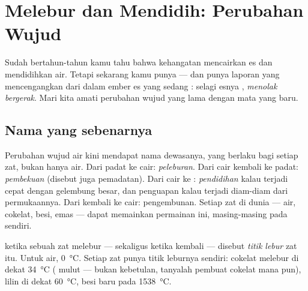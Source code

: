 \chapter{Melebur dan Mendidih: Perubahan Wujud}\label{ch:g4:changes-of-state}

Sudah bertahun-tahun kamu tahu bahwa kehangatan mencairkan es dan
mendidihkan air. Tetapi sekarang kamu punya  --- dan
 punya laporan yang mencengangkan dari dalam ember es yang
sedang : selagi esnya ,  \emph{menolak bergerak}.
Mari kita amati perubahan wujud yang lama dengan mata yang baru.

\section{Nama yang sebenarnya}

Perubahan wujud air kini mendapat nama dewasanya, yang berlaku bagi
setiap zat, bukan hanya air. Dari padat ke cair:
\emph{peleburan}. Dari cair kembali ke padat:
\emph{pembekuan} (disebut juga pemadatan). Dari cair
ke : \emph{pendidihan} kalau terjadi cepat dengan
gelembung besar, dan penguapan kalau terjadi diam-diam dari
permukaannya. Dari  kembali ke cair: pengembunan. Setiap zat di
dunia --- air, cokelat, besi, emas --- dapat memainkan permainan ini,
masing-masing pada  sendiri.

\begin{definition}\label{def:g4:changes-of-state:melting-point}
 ketika sebuah zat melebur --- sekaligus  ketika 
 kembali --- disebut \emph{titik lebur} zat
itu. Untuk air,  \qty{0}{\celsius}. Setiap zat punya titik
leburnya sendiri: cokelat melebur di dekat \qty{34}{\celsius} (
mulut --- bukan kebetulan, tanyalah pembuat cokelat mana pun), lilin
di dekat \qty{60}{\celsius}, besi baru pada \qty{1538}{\celsius}.
\end{definition}

